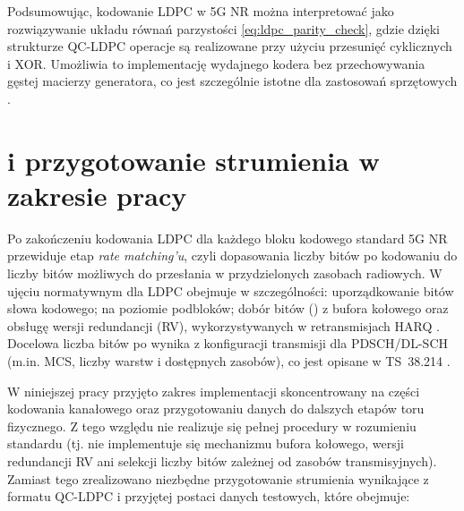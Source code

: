 Podsumowując, kodowanie LDPC w 5G NR można interpretować jako rozwiązywanie układu równań parzystości \eqref{eq:ldpc_parity_check},
gdzie dzięki strukturze QC-LDPC operacje są realizowane przy użyciu przesunięć cyklicznych i XOR. Umożliwia to implementację
wydajnego kodera bez przechowywania gęstej macierzy generatora, co jest szczególnie istotne dla zastosowań sprzętowych \cite{bib:nguyen2019_qcldpc}.

\section{ i przygotowanie strumienia w zakresie pracy}
\label{sec:analiza_ratematching}

Po zakończeniu kodowania LDPC dla każdego bloku kodowego standard 5G NR przewiduje etap \emph{rate matching'u},
czyli dopasowania liczby bitów po kodowaniu do liczby bitów możliwych do przesłania w przydzielonych zasobach radiowych.
W ujęciu normatywnym  dla LDPC obejmuje w szczególności: uporządkowanie bitów słowa kodowego;
 na poziomie podbloków; dobór bitów () z bufora kołowego oraz obsługę wersji redundancji (RV),
wykorzystywanych w retransmisjach HARQ \cite{bib:3gpp_38212}. Docelowa liczba bitów po  wynika z konfiguracji transmisji
dla PDSCH/DL-SCH (m.in. MCS, liczby warstw i dostępnych zasobów), co jest opisane w TS~38.214 \cite{bib:3gpp_38214}.

W niniejszej pracy przyjęto zakres implementacji skoncentrowany na części kodowania kanałowego oraz przygotowaniu danych
do dalszych etapów toru fizycznego. Z tego względu nie realizuje się pełnej procedury  w rozumieniu standardu
(tj. nie implementuje się mechanizmu bufora kołowego, wersji redundancji RV ani selekcji liczby bitów zależnej od zasobów transmisyjnych).
Zamiast tego zrealizowano niezbędne przygotowanie strumienia wynikające z formatu QC-LDPC i przyjętej postaci danych testowych,
które obejmuje:

